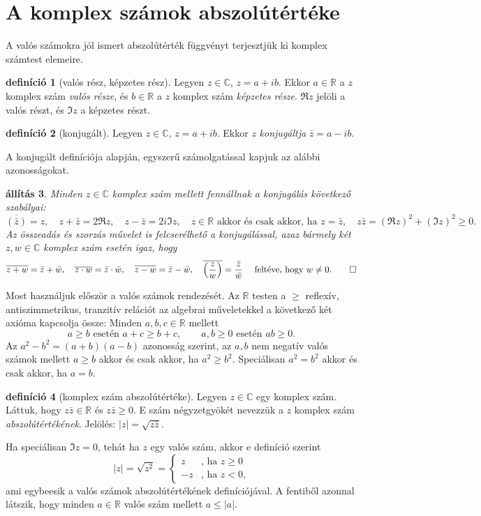\documentclass[9pt, a4paper, showtrims]{memoir}
\theoremstyle{plain}
\newtheorem{proposition}{állítás}[chapter]
\theoremstyle{remark}
\theoremstyle{definition}
\newtheorem{definition}[proposition]{definíció}
\begin{document}
\section{A komplex számok abszolútértéke}
A valós számokra jól ismert abszolútérték függvényt terjesztjük ki komplex számtest elemeire.
\begin{definition}[valós rész, képzetes rész]
	Legyen $z\in\mathbb{C}$, $z=a+ib$.
	Ekkor $a\in\mathbb{R}$ a $z$ komplex szám \emph{valós része},
	és $b\in\mathbb{R}$ a $z$ komplex szám \emph{képzetes része}.
	$\Re z$ jelöli a valós részt, és $\Im z$ a képzetes részt.
\end{definition}
\begin{definition}[konjugált]
	Legyen $z\in\mathbb{C}$, $z=a+ib$.
	Ekkor $z$ \emph{konjugáltja} $\bar{z}=a-ib$.
\end{definition}
A konjugált definíciója alapján, egyszerű számolgatással kapjuk az alábbi azonosságokat.
\begin{proposition}
	Minden $z\in\mathbb{C}$ komplex szám mellett fennállnak a konjugálás következő szabályai:
	\[
		\overline{\left( \bar{z} \right)}=z,\quad
		z+\bar{z}=2\Re z,\quad
		z-\bar{z}=2i\Im z,\quad
		z\in\mathbb{R}\text{ akkor és csak akkor, ha } z=\bar{z},\quad
		z\bar{z}=(\Re z)^2+(\Im z)^2\geq 0.
	\]
	Az összeadás és szorzás művelet is felcserélhető a konjugálással,
	azaz bármely két $z,w\in\mathbb{C}$ komplex szám esetén igaz, hogy
	\[
		\overline{z+w}=\bar{z}+\bar{w},\quad
		\overline{z\cdot w}=\bar{z}\cdot\bar{w},\quad
		\overline{z-w}=\bar{z}-\bar{w},\quad
		\overline{\left( \frac{z}{w} \right)}=\frac{\bar{z}}{\bar{w}}\quad\text{ feltéve, hogy }w\neq 0.\qedhere
	\]
\end{proposition}
Most használjuk először a valós számok rendezését.
Az $\mathbb{R}$ testen a $\geq $ reflexív, antiszimmetrikus, tranzitív relációt az algebrai műveletekkel a következő két axióma kapcsolja össze:
Minden $a,b,c\in\mathbb{R}$ mellett
\[
	a\geq b\text{ esetén }a+c\geq b+c,\qquad a,b\geq 0\text{ esetén }ab\geq 0.
\]
Az $a^2-b^2=\left( a+b \right)\left( a-b \right)$ azonosság szerint,
az $a,b$ nem negatív valós számok mellett $a\geq b$ akkor és csak akkor, ha $a^2\geq b^2$.
Speciálisan $a^2=b^2$ akkor és csak akkor, ha $a=b$.

\begin{definition}[komplex szám abszolútértéke]
	Legyen $z\in\mathbb{C}$ egy komplex szám.
	Láttuk, hogy
	$z\bar{z}\in\mathbb{R}$ és
	$z\bar{z}\geq 0$.
	E szám négyzetgyökét nevezzük a $z$ komplex szám \emph{abszolútértékének}.
	Jelölés: $|z|=\sqrt{z\bar{z}}$.
\end{definition}
Ha speciálisan $\Im z=0$,
tehát ha $z$ egy valós szám,
akkor e definíció szerint
\[
	|z|=
	\sqrt{z^2}=
	\begin{cases}
		z  & \text{, ha }z\geq 0     \\
		-z & \text{, ha }z<0\text{,}
	\end{cases}
\]
ami egybeesik a valós számok abszolútértékének definíciójával.
A fentiből azonnal látszik, hogy minden $a\in\mathbb{R}$ valós szám mellett $a\leq|a|$.
\end{document}
